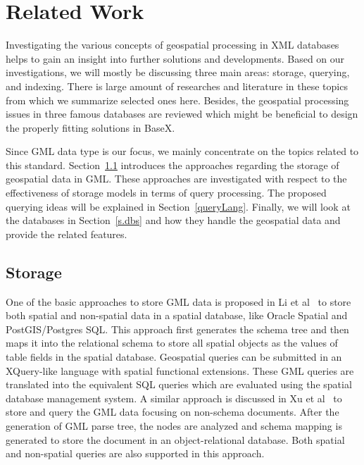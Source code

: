 \documentclass[a4paper,12pt]{article}
\begin{document}

\newpage








\section{Related Work}
\label{s.rwork}
Investigating the various concepts of geospatial processing in XML databases helps to gain an insight into further solutions and developments. 
Based on our investigations, we will mostly be discussing three main areas: storage, querying, and indexing. There is large amount of researches and literature in these topics from which we summarize selected ones here. Besides, the geospatial processing issues in three famous databases are reviewed which might be beneficial to design the properly fitting solutions in BaseX. %

Since GML data type is our focus, we mainly concentrate on the topics related to this standard. Section~\ref{storage} introduces the approaches regarding the storage of geospatial data in GML. 
These approaches are investigated with respect to the effectiveness of storage models in terms of query processing. The proposed querying ideas will be explained in Section~\ref{queryLang}. 
Finally, we will look at the databases in Section~\ref{s.dbs} and how they handle the geospatial data and provide the related features.
  
\subsection{Storage}
\label{storage}
One of the basic approaches to store GML data is proposed in Li et al~\cite{Li2004} to store both spatial and non-spatial data in a spatial database, like Oracle Spatial and PostGIS/Postgres SQL. This approach first generates the schema tree and then maps it into the relational schema to store all spatial objects as the values of table fields in the spatial database. Geospatial queries can be submitted 
in an XQuery-like language with spatial functional extensions. These GML queries are translated into the equivalent SQL queries which are evaluated using the spatial database management system. 
A similar approach is discussed in Xu et al~\cite{Zhu2011} to store and query the GML data focusing on non-schema documents. After the generation of GML parse tree, the nodes are analyzed and schema mapping is generated to store the document in an object-relational database. 
Both spatial and non-spatial queries are also supported in this approach.
\end{document}
